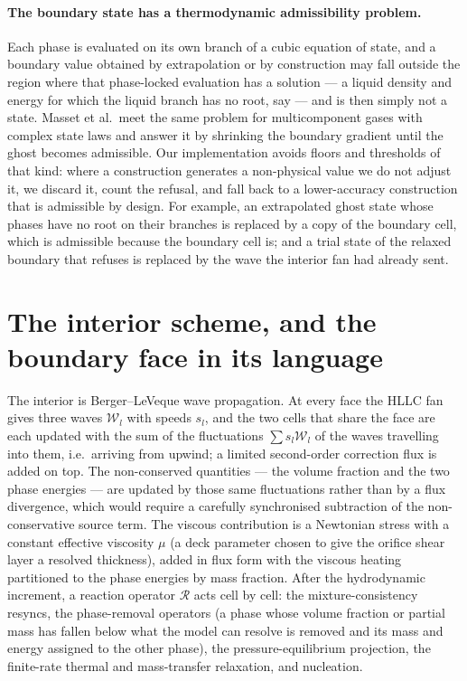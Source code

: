 \documentclass[11pt,a4paper]{article}
\newcommand{\W}{\mathcal{W}}
\begin{document}
\paragraph{The boundary state has a thermodynamic admissibility
problem.}  Each phase is evaluated on its own branch of a cubic
equation of state, and a boundary value obtained by extrapolation or by
construction may fall outside the region where that phase-locked
evaluation has a solution --- a liquid density and energy for which the
liquid branch has no root, say --- and is then simply not a state.
Masset et al.\ meet the same problem for multicomponent gases with
complex state laws and answer it by shrinking the boundary gradient
until the ghost becomes admissible.  Our implementation avoids floors
and thresholds of that kind: where a construction generates a
non-physical value we do not adjust it, we discard it, count the
refusal, and fall back to a lower-accuracy construction that is
admissible by design.  For example, an extrapolated ghost state whose
phases have no root on their branches is replaced by a copy of the
boundary cell, which is admissible because the boundary cell is; and a
trial state of the relaxed boundary that refuses is replaced by the
wave the interior fan had already sent.

\section{The interior scheme, and the boundary face in its language}

The interior is Berger--LeVeque wave propagation.  At every face the
HLLC fan gives three waves $\W_l$ with speeds $s_l$, and the two cells
that share the face are each updated with the sum of the fluctuations
$\sum s_l \W_l$ of the waves travelling into them, i.e.\ arriving from
upwind; a limited second-order correction flux is added on top.  The
non-conserved quantities --- the volume fraction and the two phase
energies --- are updated by those same fluctuations rather than by a
flux divergence, which would require a carefully synchronised
subtraction of the non-conservative source term.  The viscous
contribution is a Newtonian stress with a constant effective viscosity
$\mu$ (a deck parameter chosen to give the orifice shear layer a
resolved thickness), added in flux form with the viscous heating
partitioned to the phase energies by mass fraction.  After the
hydrodynamic increment, a reaction operator $\mathcal{R}$ acts cell by
cell: the mixture-consistency resyncs, the phase-removal operators (a
phase whose volume fraction or partial mass has fallen below what the
model can resolve is removed and its mass and energy assigned to the
other phase), the pressure-equilibrium projection, the finite-rate
thermal and mass-transfer relaxation, and nucleation.
\end{document}
